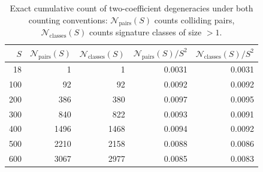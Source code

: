 \begin{table}[h!]
\centering
\caption{Exact cumulative count of two-coefficient degeneracies under both counting conventions: $\mathcal N_{\mathrm{pairs}}(S)$ counts colliding pairs, $\mathcal N_{\mathrm{classes}}(S)$ counts signature classes of size $>1$.}
\label{tab:density-both}
\begin{tabular}{rrrrr}
\toprule
$S$ & $\mathcal N_{\mathrm{pairs}}(S)$ & $\mathcal N_{\mathrm{classes}}(S)$ & $\mathcal N_{\mathrm{pairs}}(S)/S^2$ & $\mathcal N_{\mathrm{classes}}(S)/S^2$ \\
\midrule
18   & 1     & 1     & 0.0031 & 0.0031 \\
100  & 92    & 92    & 0.0092 & 0.0092 \\
200  & 386   & 380   & 0.0097 & 0.0095 \\
300  & 840   & 822   & 0.0093 & 0.0091 \\
400  & 1496  & 1468  & 0.0094 & 0.0092 \\
500  & 2210  & 2158  & 0.0088 & 0.0086 \\
600  & 3067  & 2977  & 0.0085 & 0.0083 \\
\bottomrule
\end{tabular}
\end{table}
